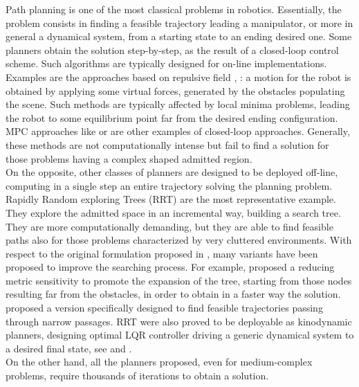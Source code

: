 \documentclass[letterpaper, 10 pt, conference]{ieeeconf}  %
\begin{document}
Path planning is one of the most classical problems in robotics. 
Essentially, the problem consists in finding a feasible trajectory leading a manipulator, or more in general a dynamical system, from a starting state to an ending desired one.
Some planners obtain the solution step-by-step, as the result of a closed-loop control scheme.
Such algorithms are typically designed for on-line implementations.
Examples are the approaches based on repulsive field \cite{Khatib_repulsive}, \cite{Rimon_repulsive}: a motion for the robot is obtained by applying some virtual forces, generated by the obstacles populating the scene.  
Such methods are typically affected by local minima problems, leading the robot to some equilibrium point far from the desired ending configuration.
MPC approaches like \cite{MPC_01} or \cite{MPC_02} are other examples of closed-loop approaches.
Generally, these methods are not computationally intense but fail to find a solution for those problems having a complex shaped admitted region. 
\\
On the opposite, other classes of planners are designed to be deployed off-line, computing in a single step an entire trajectory solving the planning problem.
Rapidly Random exploring Trees (RRT) \cite{RRT_LaValle} are the most representative example.
They explore the admitted space in an incremental way, building a search tree. They are more computationally demanding, but they are able to find feasible paths also for those problems characterized by very cluttered environments. 
With respect to the original formulation proposed in \cite{RRT_LaValle}, many variants have been proposed to improve the searching process. For example, \cite{RC_RRT} proposed a reducing metric sensitivity to promote the expansion of the tree, starting from those nodes resulting far from the obstacles, in order to obtain in a faster way the solution. 
\cite{RRT_narrow} proposed a version specifically designed to find feasible trajectories passing through narrow passages.
RRT were also proved to be deployable as kinodynamic planners, designing optimal LQR controller driving a generic dynamical system to a desired final state, see \cite{LQR_RRT_01} and  
\cite{LQR_RRT_02}.
\\
On the other hand, all the planners proposed, even for medium-complex problems, require thousands of iterations to obtain a solution. 
\end{document}
